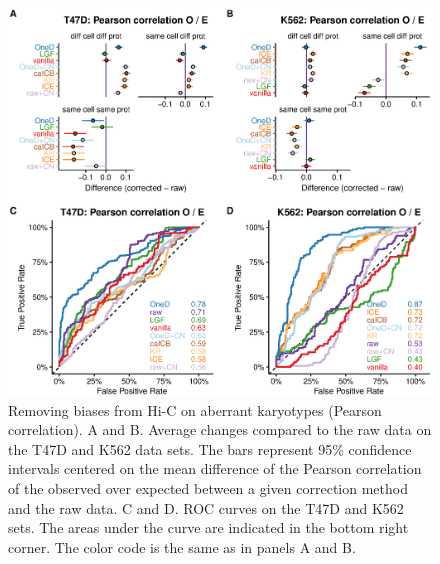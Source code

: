 \documentclass[12pt]{report}
\begin{document}
\begin{figure}
	\centerline{\includegraphics[width=\textwidth]{nar_figures/supp_figure_5.eps}}
    \caption{
    Removing biases from Hi-C on aberrant karyotypes (Pearson correlation). A and B. Average changes
    compared to the raw data on the T47D and K562 data sets. The bars represent
    95\% confidence intervals centered on the mean difference of the
    Pearson correlation of the observed over expected between a given correction method and the raw data. C
    and D. ROC curves on the T47D and K562 sets. The areas under the curve are
    indicated in the bottom right corner. The color code is the same as in panels A and B.}
\end{figure}
\end{document}

